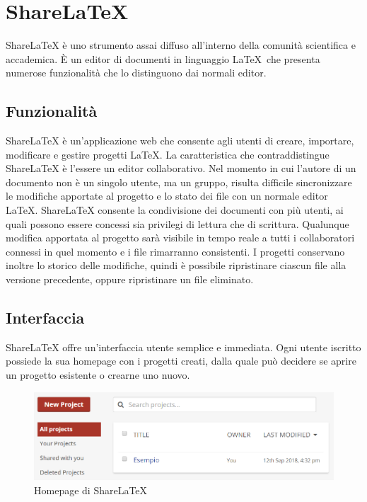 \chapter{ShareLaTeX}
\label{ShareLaTeX}
\thispagestyle{empty}

ShareLaTeX è uno strumento assai diffuso all'interno della comunità scientifica e accademica. È un editor di documenti in linguaggio \LaTeX ~che presenta numerose funzionalità che lo distinguono dai normali editor.

\section{Funzionalità}

ShareLaTeX è un'applicazione web che consente agli utenti di creare, importare, modificare e gestire progetti \LaTeX. La caratteristica che contraddistingue ShareLaTeX è l'essere un editor collaborativo. Nel momento in cui l'autore di un documento non è un singolo utente, ma un gruppo, risulta difficile sincronizzare le modifiche apportate al progetto e lo stato dei file con un normale editor \LaTeX. ShareLaTeX consente la condivisione dei documenti con più utenti, ai quali possono essere concessi sia privilegi di lettura che di scrittura. Qualunque modifica apportata al progetto sarà visibile in tempo reale a tutti i collaboratori connessi in quel momento e i file rimarranno consistenti. I progetti conservano inoltre lo storico delle modifiche, quindi è possibile ripristinare ciascun file alla versione precedente, oppure ripristinare un file eliminato.

\section{Interfaccia}
ShareLaTeX offre un'interfaccia utente semplice e immediata. Ogni utente iscritto possiede la sua homepage con i progetti creati, dalla quale può decidere se aprire un progetto esistente o crearne uno nuovo.
\begin{figure}[h]
    \centering
    \includegraphics[width=\textwidth]{immagini/homepage.PNG}
    \caption{Homepage di ShareLaTeX}
    \label{fig:sharelatex_homepage}
\end{figure}

